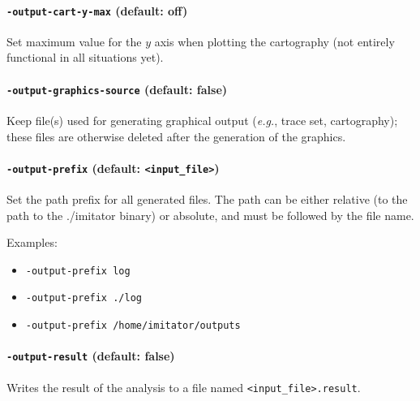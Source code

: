 \documentclass[a4paper,11pt]{report}
\makeatletter
\newcommand{\binimitator}{./imitator}
\newcommand{\styleOption}[1]{\textcolor{optioncolor}{\texttt{#1}}}
\newcommand{\stylePath}[1]{\textcolor{pathcolor}{\texttt{#1}}}
\newcommand{\eg}{\textcolor{colorok}{\textit{e.g.},\@}}
\makeatother
\begin{document}
\paragraph{\styleOption{-output-cart-y-max} (default: off)}
Set maximum value for the $y$ axis when plotting the cartography (not entirely functional in all situations yet).



\paragraph{\styleOption{-output-graphics-source} (default: false)}
Keep file(s) used for generating graphical output (\eg{} trace set, cartography); these files are otherwise deleted after the generation of the graphics.


\paragraph{\styleOption{-output-prefix} (default: \stylePath{<input\_file>})}
Set the path prefix for all generated files.
The path can be either relative (to the path to the \binimitator{} binary) or absolute, and must be followed by the file name.

Examples:
\begin{itemize}
	\item \styleOption{-output-prefix log}
	\item \styleOption{-output-prefix ./log}
	\item \styleOption{-output-prefix /home/imitator/outputs}
\end{itemize}


\paragraph{\styleOption{-output-result} (default: false)}
Writes the result of the analysis to a file named \stylePath{<input\_file>.result}.


\end{document}
